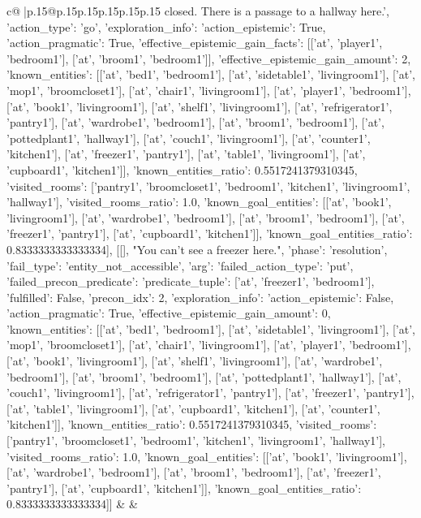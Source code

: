\documentclass{article}
\begin{document}
{\begin{supertabular}{c@{$\;$}|p{.15\linewidth}@{}p{.15\linewidth}p{.15\linewidth}p{.15\linewidth}p{.15\linewidth}p{.15\linewidth}}
{{{closed. There is a passage to a hallway here.', {'action_type': 'go', 'exploration_info': {'action_epistemic': True, 'action_pragmatic': True, 'effective_epistemic_gain_facts': [['at', 'player1', 'bedroom1'], ['at', 'broom1', 'bedroom1']], 'effective_epistemic_gain_amount': 2, 'known_entities': [['at', 'bed1', 'bedroom1'], ['at', 'sidetable1', 'livingroom1'], ['at', 'mop1', 'broomcloset1'], ['at', 'chair1', 'livingroom1'], ['at', 'player1', 'bedroom1'], ['at', 'book1', 'livingroom1'], ['at', 'shelf1', 'livingroom1'], ['at', 'refrigerator1', 'pantry1'], ['at', 'wardrobe1', 'bedroom1'], ['at', 'broom1', 'bedroom1'], ['at', 'pottedplant1', 'hallway1'], ['at', 'couch1', 'livingroom1'], ['at', 'counter1', 'kitchen1'], ['at', 'freezer1', 'pantry1'], ['at', 'table1', 'livingroom1'], ['at', 'cupboard1', 'kitchen1']], 'known_entities_ratio': 0.5517241379310345, 'visited_rooms': ['pantry1', 'broomcloset1', 'bedroom1', 'kitchen1', 'livingroom1', 'hallway1'], 'visited_rooms_ratio': 1.0, 'known_goal_entities': [['at', 'book1', 'livingroom1'], ['at', 'wardrobe1', 'bedroom1'], ['at', 'broom1', 'bedroom1'], ['at', 'freezer1', 'pantry1'], ['at', 'cupboard1', 'kitchen1']], 'known_goal_entities_ratio': 0.8333333333333334}}], [[], "You can't see a freezer here.", {'phase': 'resolution', 'fail_type': 'entity_not_accessible', 'arg': {'failed_action_type': 'put', 'failed_precon_predicate': {'predicate_tuple': ['at', 'freezer1', 'bedroom1'], 'fulfilled': False, 'precon_idx': 2}}, 'exploration_info': {'action_epistemic': False, 'action_pragmatic': True, 'effective_epistemic_gain_amount': 0, 'known_entities': [['at', 'bed1', 'bedroom1'], ['at', 'sidetable1', 'livingroom1'], ['at', 'mop1', 'broomcloset1'], ['at', 'chair1', 'livingroom1'], ['at', 'player1', 'bedroom1'], ['at', 'book1', 'livingroom1'], ['at', 'shelf1', 'livingroom1'], ['at', 'wardrobe1', 'bedroom1'], ['at', 'broom1', 'bedroom1'], ['at', 'pottedplant1', 'hallway1'], ['at', 'couch1', 'livingroom1'], ['at', 'refrigerator1', 'pantry1'], ['at', 'freezer1', 'pantry1'], ['at', 'table1', 'livingroom1'], ['at', 'cupboard1', 'kitchen1'], ['at', 'counter1', 'kitchen1']], 'known_entities_ratio': 0.5517241379310345, 'visited_rooms': ['pantry1', 'broomcloset1', 'bedroom1', 'kitchen1', 'livingroom1', 'hallway1'], 'visited_rooms_ratio': 1.0, 'known_goal_entities': [['at', 'book1', 'livingroom1'], ['at', 'wardrobe1', 'bedroom1'], ['at', 'broom1', 'bedroom1'], ['at', 'freezer1', 'pantry1'], ['at', 'cupboard1', 'kitchen1']], 'known_goal_entities_ratio': 0.8333333333333334}}]] 
	  } 
	   } 
	   } 
	 & & \\ 
 


\end{supertabular}}
\end{document}
